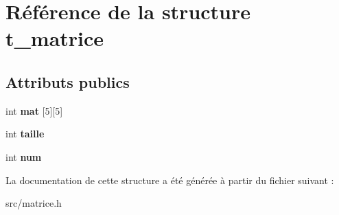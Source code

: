 \hypertarget{structt__matrice}{}\section{Référence de la structure t\+\_\+matrice}
\label{structt__matrice}
\subsection*{Attributs publics}
\begin{DoxyCompactItemize}
\item 
int {\bfseries mat} \mbox{[}5\mbox{]}\mbox{[}5\mbox{]}\hypertarget{structt__matrice_a0fbccd86aa607efff74de103029b3da0}{}\label{structt__matrice_a0fbccd86aa607efff74de103029b3da0}

\item 
int {\bfseries taille}\hypertarget{structt__matrice_a4df902007b2c86629d7f117a662d4485}{}\label{structt__matrice_a4df902007b2c86629d7f117a662d4485}

\item 
int {\bfseries num}\hypertarget{structt__matrice_ac7b3db002a24749884aeac8bc1a05ab1}{}\label{structt__matrice_ac7b3db002a24749884aeac8bc1a05ab1}

\end{DoxyCompactItemize}


La documentation de cette structure a été générée à partir du fichier suivant \+:\begin{DoxyCompactItemize}
\item 
src/matrice.\+h\end{DoxyCompactItemize}
